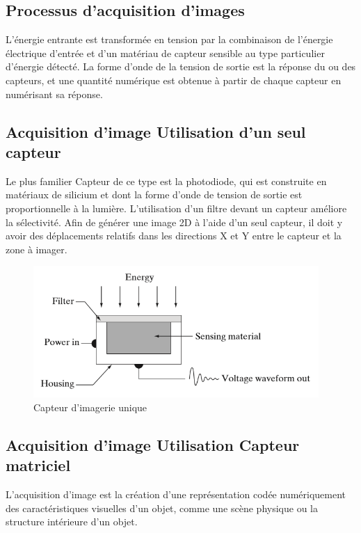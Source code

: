 \documentclass[12pt,a4paper]{report}
\numberwithin{equation}{subsection}
\numberwithin{equation}{section}
\begin{document}
\subsection{Processus d'acquisition d'images}
L'énergie entrante est transformée en tension par la combinaison de l'énergie électrique d'entrée et d'un matériau de capteur sensible au type particulier d'énergie détecté.  \newline
La forme d'onde de la tension de sortie est la réponse du ou des capteurs, et une quantité numérique est obtenue à partir de chaque capteur en numérisant sa réponse.
\newline
\newline
\subsection{Acquisition d'image Utilisation d'un seul capteur }
 Le plus familier Capteur de ce type est la photodiode, qui est construite en matériaux de silicium et dont la forme d'onde de tension de sortie est proportionnelle à la lumière. L'utilisation d'un filtre devant un capteur améliore la sélectivité. Afin de générer une image 2D à l'aide d'un seul capteur, il doit y avoir des déplacements relatifs dans les directions X et Y entre le capteur et la zone à imager.
 \begin{figure}[!h]
    \centering
    \begin{center}
        \includegraphics[height=5cm,width=10cm\textwidth]{capteur2.png}
    \end{center}
    \caption{Capteur d'imagerie unique}
\end{figure}
 \newline
\newline
\newline
\newline
\newline

\subsection{Acquisition d'image Utilisation  Capteur matriciel}
L'acquisition d'image est la création d'une représentation codée numériquement des caractéristiques visuelles d'un objet,
 comme une scène physique ou la structure intérieure d'un objet.
\end{document}
